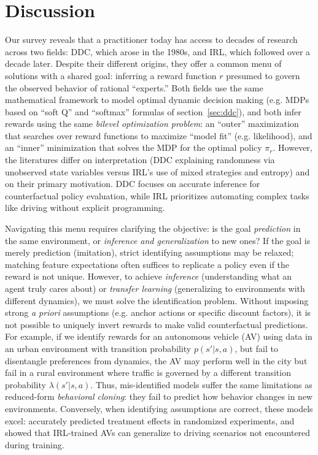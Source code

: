 \section{Discussion\label{sec:conclusion}}

Our survey reveals that a practitioner today has access to decades of research across two fields: DDC, which arose in the 1980s, and IRL, which followed over a decade later.
Despite their different origins, they offer a common menu of solutions with a shared goal: inferring a reward function $r$ presumed to govern the observed behavior of rational ``experts.''
Both fields use the same mathematical framework to model optimal dynamic decision making (e.g. MDPs based on ``soft Q'' and ``softmax'' formulas of section~\ref{sec:ddc}),
and both infer rewards using the same {\it bilevel optimization problem\/}: an ``outer'' maximization that searches over reward functions to maximize ``model fit''
(e.g. likelihood), and an ``inner'' minimization that solves the MDP for the optimal policy $\pi_r$.
However, the literatures differ on interpretation (DDC explaining randomness via unobserved state variables versus IRL's use of mixed strategies and entropy) and
on their primary motivation. DDC focuses on accurate inference for counterfactual policy evaluation, while IRL prioritizes automating complex tasks
like driving without explicit programming.

Navigating this menu requires clarifying the objective: is the goal {\it prediction\/} in the same environment, or {\it inference and generalization\/} to new ones?
If the goal is merely prediction (imitation), strict identifying assumptions may be relaxed; matching feature expectations often suffices to replicate a policy even if the reward is not unique.
However, to achieve {\it inference\/} (understanding what an agent truly cares about) or {\it transfer learning\/} (generalizing to environments with different dynamics),
we must solve the identification problem. Without imposing strong {\it a priori\/} assumptions (e.g. anchor actions or specific discount factors), it is not possible to uniquely invert rewards
to make valid counterfactual predictions.
For example, if we identify rewards for an autonomous vehicle (AV) using data in an urban environment with transition probability $p(s'|s,a)$, but fail to disentangle preferences from dynamics,
the AV may perform well in the city but fail in a rural environment where traffic is  governed by a different transition probability $\lambda(s'|s,a)$.
Thus, mis-identified models suffer the same limitations as reduced-form {\it behavioral cloning\/}: they fail to predict how behavior changes in new environments.
Conversely, when identifying assumptions are correct, these models excel: \citet{toddwolpin:2006} accurately predicted treatment effects in randomized experiments,
and \citet{zhuang:2024} showed that IRL-trained AVs can generalize to driving scenarios not encountered during training.

